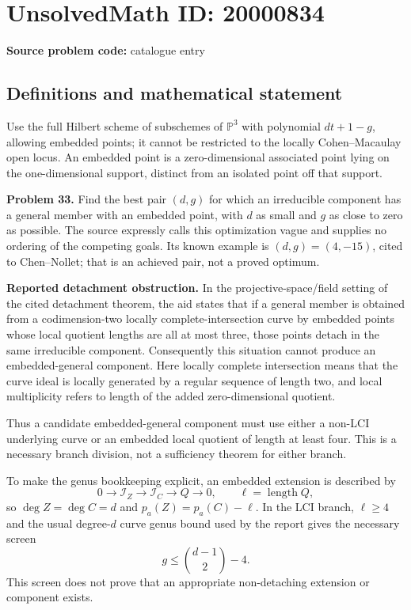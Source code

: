 \documentclass[11pt]{article}
\newcommand{\PP}{\mathbb{P}}
\begin{document}
\section*{UnsolvedMath ID: 20000834}
\textbf{Source problem code:} catalogue entry
\subsection{Definitions and mathematical statement}
Use the full Hilbert scheme of subschemes of $\PP^3$ with polynomial $dt+1-g$, allowing embedded points; it cannot be restricted to the locally Cohen--Macaulay open locus. An embedded point is a zero-dimensional associated point lying on the one-dimensional support, distinct from an isolated point off that support.

\textbf{Problem 33.} Find the best pair $(d,g)$ for which an irreducible component has a general member with an embedded point, with $d$ as small and $g$ as close to zero as possible. The source expressly calls this optimization vague and supplies no ordering of the competing goals. Its known example is $(d,g)=(4,-15)$, cited to Chen--Nollet; that is an achieved pair, not a proved optimum.

\textbf{Reported detachment obstruction.} In the projective-space/field setting of the cited detachment theorem, the aid states that if a general member is obtained from a codimension-two locally complete-intersection curve by embedded points whose local quotient lengths are all at most three, those points detach in the same irreducible component. Consequently this situation cannot produce an embedded-general component. Here locally complete intersection means that the curve ideal is locally generated by a regular sequence of length two, and local multiplicity refers to length of the added zero-dimensional quotient.

Thus a candidate embedded-general component must use either a non-LCI underlying curve or an embedded local quotient of length at least four. This is a necessary branch division, not a sufficiency theorem for either branch.

To make the genus bookkeeping explicit, an embedded extension is described by
\[
 0\longrightarrow\mathcal I_Z\longrightarrow\mathcal I_C\longrightarrow Q\longrightarrow0,
 \qquad\ell=\operatorname{length}Q,
\]
so $\deg Z=\deg C=d$ and $p_a(Z)=p_a(C)-\ell$. In the LCI branch, $\ell\geq4$ and the usual degree-$d$ curve genus bound used by the report gives the necessary screen
\[
 g\leq\binom{d-1}{2}-4.
\]
This screen does not prove that an appropriate non-detaching extension or component exists.
\end{document}
